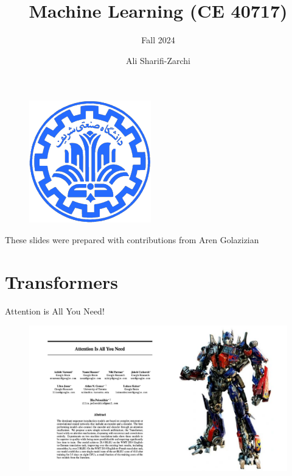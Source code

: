 \documentclass[serif, aspectratio=169]{beamer}
\author{Ali Sharifi-Zarchi}
\title{Machine Learning (CE 40717)}
\subtitle{Fall 2024}
\institute{
    CE Department \\
    Sharif University of Technology
}
\begin{document}
\begin{frame}
    \titlepage
    \vspace*{-0.6cm}
    \begin{figure}[htpb]
        \begin{center}
            \includegraphics[keepaspectratio, scale=0.25]{pic/sharif-main-logo.png}
        \end{center}
    \end{figure}
\end{frame}

\begin{frame}
    \centering
    These slides were prepared with contributions from Aren Golazizian
\end{frame}

\begin{frame}    
\tableofcontents[sectionstyle=show,
subsectionstyle=show/shaded/hide,
subsubsectionstyle=show/shaded/hide]
\end{frame}

\section{Transformers}

\begin{frame}{Attention is All You Need!}
    \begin{figure}
        \centering
        \includegraphics[width=0.9\linewidth]{Figures/Untitled presentation (2).pdf}
        \label{fig:enter-label}
    \end{figure}
\end{frame}
\newpage
\end{document}
